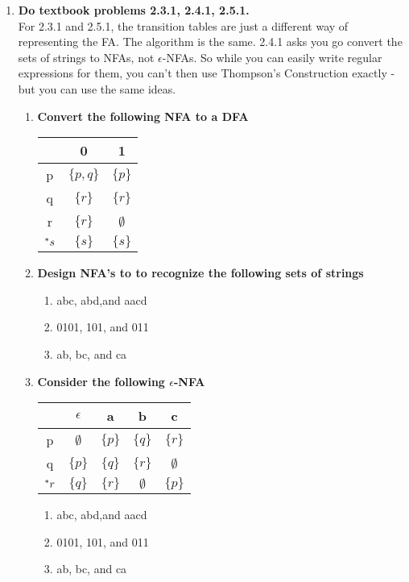 \begin{enumerate}
\newpage
\item \textbf{Do textbook problems 2.3.1, 2.4.1, 2.5.1.}
\\ For 2.3.1 and 2.5.1, the transition tables are just a different way of representing the FA. The algorithm is the same.
2.4.1 asks you go convert the sets of strings to NFAs, not $\epsilon$-NFAs. So while you can easily write regular expressions for them, you can't then use Thompson's Construction exactly -  but you can use the same ideas.
\begin{enumerate}
	\item \textbf{Convert the following NFA to a DFA}
	\begin{table}[H]
						\centering
		\begin{tabular}{c||c|c}
			 &  0 &  1   \\ \hline
			p& $\{p,q\}$ &  $\{p\}$   \\ \hline
			q&  $\{r\}$& $\{r\}$   \\ \hline
			r&  $\{r\}$& $\emptyset$   \\ \hline
			${}^\ast s$& $\{s\}$ & $\{s\}$ \\ \hline
		\end{tabular}
	\end{table}

	\item \textbf{Design NFA's to to recognize the following sets of strings}
		\begin{enumerate}
			\item abc, abd,and aacd 
			\item 0101, 101, and 011
			\item ab, bc, and ca 
		\end{enumerate}

	\item \textbf{Consider the following $\epsilon$-NFA}

		\begin{table}[H]
				\centering
		\begin{tabular}{c||c|c|c|c}
			&  $\epsilon$ &  a   & b & c\\ \hline
			p&  $\emptyset$ &  $\{p\}$  & $\{q\}$& $\{r\}$ \\ \hline
			q&  $\{p\}$& $\{q\}$   & $\{r\}$ &  $\emptyset$\\ \hline
			${}^\ast r$&  $\{q\}$& $\{r\}$ &  $\emptyset$ & $\{p\}$ \\ \hline
		\end{tabular}
	\end{table}

			\begin{enumerate}
		\item abc, abd,and aacd 
		\item 0101, 101, and 011
		\item ab, bc, and ca 
	\end{enumerate}
\end{enumerate}

\end{enumerate}



